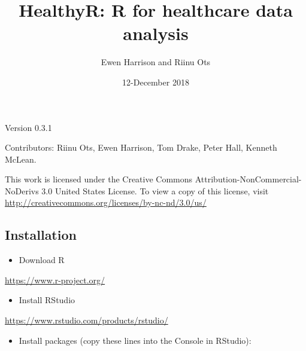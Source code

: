 \documentclass[]{book}
\title{HealthyR: R for healthcare data analysis}
\author{Ewen Harrison and Riinu Ots}
\date{12-December 2018}
\makeatletter
\providecommand{\tightlist}{%
  \setlength{\itemsep}{0pt}\setlength{\parskip}{0pt}}
\newenvironment{kframe}{%
\medskip{}
\setlength{\fboxsep}{.8em}
 \def\at@end@of@kframe{}%
 \ifinner\ifhmode%
  \def\at@end@of@kframe{\end{minipage}}%
  \begin{minipage}{\columnwidth}%
 \fi\fi%
 \def\FrameCommand##1{\hskip\@totalleftmargin \hskip-\fboxsep
 \colorbox{shadecolor}{##1}\hskip-\fboxsep
     \hskip-\linewidth \hskip-\@totalleftmargin \hskip\columnwidth}%
 \MakeFramed {\advance\hsize-\width
   \@totalleftmargin\z@ \linewidth\hsize
   \@setminipage}}%
 {\par\unskip\endMakeFramed%
 \at@end@of@kframe}
\newenvironment{rmdblock}[1]
  {
  \begin{itemize}
  \renewcommand{\labelitemi}{
    \raisebox{-.7\height}[0pt][0pt]{
      {\setkeys{Gin}{width=3em,keepaspectratio}\texttt{[image: images/\#1]}}
    }
  }
  \setlength{\fboxsep}{1em}
  \begin{kframe}
  \item
  }
  {
  \end{kframe}
  \end{itemize}
  }
\newenvironment{healthyr}
  {\begin{rmdblock}{cover}}
  {\end{rmdblock}}
\theoremstyle{definition}
\theoremstyle{definition}
\theoremstyle{definition}
\theoremstyle{remark}
\makeatother
\begin{document}
\maketitle

{
\hypersetup{linkcolor=black}
\setcounter{tocdepth}{1}
\tableofcontents
}
\hypertarget{section}{%
\chapter*{}\label{section}}

Version 0.3.1

Contributors: Riinu Ots, Ewen Harrison, Tom Drake, Peter Hall, Kenneth
McLean.

This work is licensed under the Creative Commons
Attribution-NonCommercial-NoDerivs 3.0 United States License. To view a
copy of this license, visit
\url{http://creativecommons.org/licenses/by-nc-nd/3.0/us/}

\hypertarget{installation}{%
\section{Installation}\label{installation}}

\begin{healthyr}
\begin{itemize}
\tightlist
\item
  Download R
\end{itemize}
\end{healthyr}

\url{https://www.r-project.org/}

\begin{healthyr}
\begin{itemize}
\tightlist
\item
  Install RStudio
\end{itemize}
\end{healthyr}

\url{https://www.rstudio.com/products/rstudio/}

\begin{healthyr}
\begin{itemize}
\tightlist
\item
  Install packages (copy these lines into the Console in RStudio):
\end{itemize}
\end{healthyr}
\end{document}
